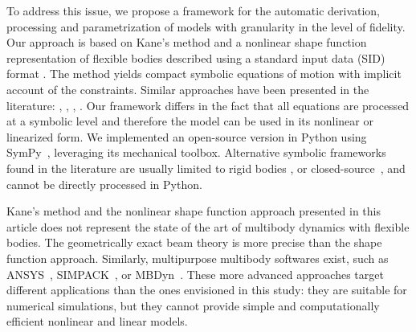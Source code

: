 \documentclass[wes, manuscript]{copernicus}
\begin{document}



To address this issue, we propose a framework for the automatic derivation, processing and
parametrization of models with granularity in the level of fidelity.
Our approach is based on Kane’s method \citep{kane:1965} and a nonlinear shape function representation of flexible bodies \citep{shabana:book}
 described using a standard input data (SID) format \citep{Wallrapp:1994, Schwertassek:book}.
The method yields compact symbolic equations of motion with implicit account of the constraints. 
Similar approaches have been presented in the literature: \cite{Kurtz:2009}, \cite{Merz:2018}, \cite{Lemmer:2018}, \cite{branlard:2019flex}.
Our framework differs in the fact that all equations are processed at a symbolic level and therefore the model can be used in its nonlinear or linearized form. 
We implemented an open-source version in Python using SymPy~\citep{sympy},  leveraging its mechanical toolbox.
Alternative symbolic frameworks found in the literature are usually limited to rigid bodies \citep{Verlinden:2005,Kurtz:2009,Gede:2013,Docquier:2013}, or closed-source~\citep{Autolev,NeweulM2,MotionGenesis}, and cannot be directly processed in Python. 

Kane's method and the nonlinear shape function approach presented in this article does not represent the state of the art of multibody dynamics with flexible bodies. 
The geometrically exact beam theory\citep{Simo:1985,Jelenic:1999,Geradin:2001:book,Bauchau:2011:book} is more precise than the shape function approach. 
Similarly, multipurpose multibody softwares exist\citep{Lange:2007}, such as ANSYS~\citep{ansys}, SIMPACK~\citep{simpack}, or MBDyn~\citep{MBDyn}. 
These more advanced approaches target different applications than the ones envisioned in this study: they are suitable for numerical simulations, but they cannot provide simple and computationally efficient nonlinear and linear models.
\end{document}

